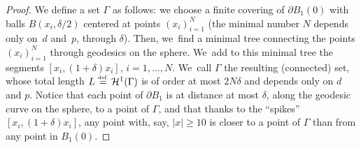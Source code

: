 \documentclass[JEP,XML,SOM,Unicode,NoFloatCountersInSection,published]{cedram}
\theoremstyle{definition}
\newcommand{\eqdef}{\ensuremath{\stackrel{\mbox{\upshape\tiny def.}}{=}}}
\newcommand\cH{\mathcal{H}}
\begin{document}
\begin{proof}
We define a set $\Gamma$ as follows: we choose a finite covering of
$\partial B_1(0)$ with balls $B(x_i,\delta/2)$ centered
at points $(x_i)_{i=1}^N$ (the minimal number $N$ depends only on~$d$ and~$p$, through $\delta$).
Then, we~find a minimal tree connecting the points $(x_i)_{i=1}^N$ through geodesics on the sphere. We~add to this minimal tree the segments $[x_i,(1+\delta)x_i]$, $i=1,\dots,N$. We~call $\Gamma$ the resulting (connected) set,
whose total length $L\eqdef \cH^1(\Gamma)$ is of order at most $2N\delta$ and depends
only on $d$ and $p$.
Notice that each point of $\partial B_1$ is at distance at most $\delta$,
along the geodesic curve on the sphere, to a point of $\Gamma$, and that thanks to
the ``spikes'' $[x_i,(1+\delta) x_i]$, any point with, say, $|x|\ge 10$ is closer to
a point of $\Gamma$ than from any point in $B_1(0)$.


\end{proof}
\end{document}
